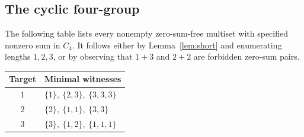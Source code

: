 \documentclass[11pt]{article}
\theoremstyle{remark}\newtheorem{remark}[theorem]{Remark}
\begin{document}
\subsection{The cyclic four-group}
The following table lists every nonempty zero-sum-free multiset with specified nonzero sum in $C_4$. It follows either by Lemma~\ref{lem:short} and enumerating lengths $1,2,3$, or by observing that $1+3$ and $2+2$ are forbidden zero-sum pairs.
\begin{center}
\begin{tabular}{cl}
\toprule
Target & Minimal witnesses \\
\midrule
$1$ & $\{1\},\ \{2,3\},\ \{3,3,3\}$\\
$2$ & $\{2\},\ \{1,1\},\ \{3,3\}$\\
$3$ & $\{3\},\ \{1,2\},\ \{1,1,1\}$\\
\bottomrule
\end{tabular}
\end{center}
\end{document}
